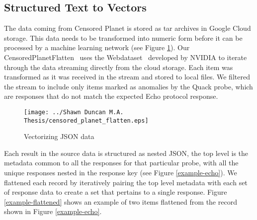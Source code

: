 \subsection{Structured Text to Vectors}\label{subsec:text2vec}
The data coming from Censored Planet is stored as tar archives in Google Cloud
storage. This data needs to be transformed into numeric form before it can be
processed by a machine learning network (see Figure \ref{fig:pre-process}). Our
CensoredPlanetFlatten~\cite{shawn_p_duncan_censored_2022} uses the
Webdataset~\cite{aizman_high_2019} developed by NVIDIA to iterate through the
data streaming directly from the cloud storage. Each item was transformed as it
was received in the stream and stored to local files.  We filtered the stream
to include only items marked as anomalies by the Quack probe, which are
responses that do not match the expected Echo protocol response.

\begin{figure}[hbt]
    \centering
    \texttt{[image: ../Shawn Duncan M.A. Thesis/censored\_planet\_flatten.eps]}
    \caption{Vectorizing JSON data}
    \label{fig:pre-process}
\end{figure}

Each result in the source data is structured as nested JSON, the top level is
the metadata common to all the responses for that particular probe, with all
the unique responses nested in the response key (see Figure
\ref{example-echo}). We flattened each record by iteratively pairing the top
level metadata with each set of response data to create a set that pertains to
a single response. Figure \ref{example-flattened} shows an example of two items
flattened from the record shown in Figure \ref{example-echo}.

